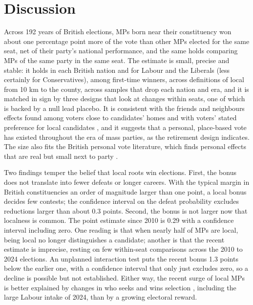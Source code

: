 \documentclass[11pt,a4paper]{article}
\begin{document}
\section{Discussion}
Across 192 years of British elections, MPs born near their constituency won about one percentage point more of the vote than other MPs elected for the same seat, net of their party's national performance, and the same holds comparing MPs of the same party in the same seat. The estimate is small, precise and stable: it holds in each British nation and for Labour and the Liberals (less certainly for Conservatives), among first-time winners, across definitions of local from 10 km to the county, across samples that drop each nation and era, and it is matched in sign by three designs that look at changes within seats, one of which is backed by a null lead placebo. It is consistent with the friends and neighbours effects found among voters close to candidates' homes \citep{arzheimerevans2012,evans2017} and with voters' stated preference for local candidates \citep{campbellcowley2014,campbell2019}, and it suggests that a personal, place-based vote has existed throughout the era of mass parties, as the retirement design indicates. The size also fits the British personal vote literature, which finds personal effects that are real but small next to party \citep{cain1987,gaines1998,eggersspirling2017}.

Two findings temper the belief that local roots win elections. First, the bonus does not translate into fewer defeats or longer careers. With the typical margin in British constituencies an order of magnitude larger than one point, a local bonus decides few contests; the confidence interval on the defeat probability excludes reductions larger than about 0.3 points. Second, the bonus is not larger now that localness is common. The point estimate since 2010 is 0.29 with a confidence interval including zero. One reading is that when nearly half of MPs are local, being local no longer distinguishes a candidate; another is that the recent estimate is imprecise, resting on few within-seat comparisons across the 2010 to 2024 elections. An unplanned interaction test puts the recent bonus 1.3 points below the earlier one, with a confidence interval that only just excludes zero, so a decline is possible but not established. Either way, the recent surge of local MPs is better explained by changes in who seeks and wins selection \citep{norrislovenduski1995}, including the large Labour intake of 2024, than by a growing electoral reward.
\end{document}
